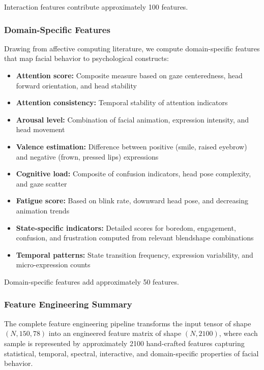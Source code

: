 \documentclass[11pt,a4paper]{article}
\begin{document}
Interaction features contribute approximately 100 features.


\subsubsection{Domain-Specific Features}

Drawing from affective computing literature, we compute domain-specific features that map facial behavior to psychological constructs:

\begin{itemize}
  \item \textbf{Attention score:} Composite measure based on gaze centeredness, head forward orientation, and head stability
  \item \textbf{Attention consistency:} Temporal stability of attention indicators
  \item \textbf{Arousal level:} Combination of facial animation, expression intensity, and head movement
  \item \textbf{Valence estimation:} Difference between positive (smile, raised eyebrow) and negative (frown, pressed lips) expressions
  \item \textbf{Cognitive load:} Composite of confusion indicators, head pose complexity, and gaze scatter
  \item \textbf{Fatigue score:} Based on blink rate, downward head pose, and decreasing animation trends
  \item \textbf{State-specific indicators:} Detailed scores for boredom, engagement, confusion, and frustration computed from relevant blendshape combinations
  \item \textbf{Temporal patterns:} State transition frequency, expression variability, and micro-expression counts
\end{itemize}

Domain-specific features add approximately 50 features.

\subsubsection{Feature Engineering Summary}

The complete feature engineering pipeline transforms the input tensor of shape $(N, 150, 78)$ into an engineered feature matrix of shape $(N, 2100)$, where each sample is represented by approximately 2100 hand-crafted features capturing statistical, temporal, spectral, interactive, and domain-specific properties of facial behavior.
\end{document}
